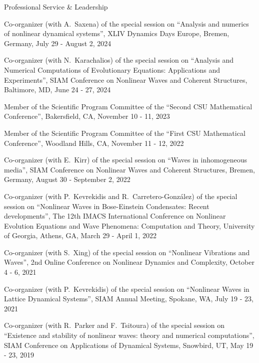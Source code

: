 \documentclass[10pt]{article} %
\newenvironment{outerlist}[1][\enskip\textbullet]%
        {\begin{itemize}[#1]}{\end{itemize}%
         \vspace{-.6\baselineskip}}
\newenvironment{innerlist}[1][\enskip\textbullet]%
        {\begin{compactitem}[#1]}{\end{compactitem}}
\begin{document}
\begin{section}{Professional Service \& Leadership}
\begin{outerlist}
\begin{innerlist}
\item[$\triangleright$] Co-organizer (with A.~Saxena) of the special session on ``Analysis and numerics of nonlinear dynamical systems'',
XLIV Dynamics Days Europe, Bremen, Germany, July 29 - August 2, 2024
\item[$\triangleright$] Co-organizer (with N.~Karachalios) of the special session on ``Analysis and
Numerical Computations of Evolutionary Equations: Applications and Experiments'',
                        SIAM Conference on Nonlinear Waves and Coherent Structures, Baltimore, MD, June 24 - 27, 2024
\item[$\triangleright$] Member of the Scientific Program Committee of the ``Second CSU Mathematical Conference'', Bakersfield, CA, November 10 - 11, 2023
\item[$\triangleright$] Member of the Scientific Program Committee of the ``First CSU Mathematical Conference'', Woodland Hills, CA, November 11 - 12, 2022
\item[$\triangleright$] Co-organizer (with E.~Kirr) of the special session on ``Waves in inhomogeneous media'',
                        SIAM Conference on Nonlinear Waves and Coherent Structures, Bremen, Germany, August 30 - September 2, 2022
\item[$\triangleright$] Co-organizer (with P.~Kevrekidis and R.~Carretero-Gonz{\'a}lez) of
                        the special session on ``Nonlinear Waves in Bose-Einstein Condensates: Recent developments'',
                        The 12th IMACS International Conference on Nonlinear Evolution Equations and Wave Phenomena:
                        Computation and Theory, University of Georgia, Athens, GA, March 29 - April 1, 2022
\item[$\triangleright$] Co-organizer (with S.~Xing) of the special session on ``Nonlinear Vibrations and Waves'', %
                        2nd Online Conference on Nonlinear Dynamics and Complexity, October 4 - 6, 2021
\item[$\triangleright$] Co-organizer (with P.~Kevrekidis) of the special session on
                         ``Nonlinear Waves in Lattice Dynamical Systems'',
                         SIAM Annual Meeting, Spokane, WA, July 19 - 23, 2021
\item[$\triangleright$] Co-organizer (with R.~Parker and F.~Tsitoura) of the special session on
                        ``Existence and stability of nonlinear waves: theory and numerical computations'',
                        SIAM Conference on Applications of Dynamical Systems, Snowbird, UT, May 19 - 23, 2019

\end{innerlist}
\end{outerlist}
\end{section}
\end{document}
